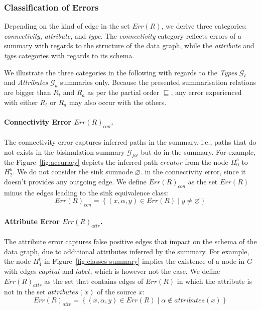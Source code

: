 \subsubsection{Classification of Errors}

Depending on the kind of edge in the set $Err(R)$, we derive three categories: \emph{connectivity}, \emph{attribute}, and \emph{type}. The \emph{connectivity} category reflects errors of a summary with regards to the structure of the data graph, while the \emph{attribute} and \emph{type} categories with regards to its schema.

We illustrate the three categories in the following with regards to the \emph{Types} $\mathcal{G}_t$ and \emph{Attributes} $\mathcal{G}_a$ summaries only. Because the presented summarisation relations are bigger than $R_t$ and $R_a$ as per the partial order $\sqsubseteq$, any error experienced with either $R_t$ or $R_a$ may also occur with the others.

\paragraph{Connectivity Error $Err(R)_{con}$.}

The connectivity error captures inferred paths in the summary, i.e., paths that do not exists in the bisimulation summary $\mathcal{G}_{fbt}$ but do in the summary. For example, the Figure~\ref{fig:accuracy} depicts the inferred path $creator$ from the node $H^b_0$ to $H^b_2$.
We do not consider the sink sumnode $\varnothing$. in the connectivity error, since it doesn't provides any outgoing edge. We define $Err(R)_{con}$ as the set $Err(R)$ minus the edges leading to the sink equivalence class:
$$
Err(R)_{con} = \left\lbrace (x, \alpha, y) \in Err(R) \mid y \neq \varnothing \right\rbrace
$$

\paragraph{Attribute Error $Err(R)_{attr}$.}

The attribute error captures false positive edges that impact on the schema of the data graph, due to additional attributes inferred by the summary. For example, the node $H^t_4$ in Figure~\ref{fig:classes-summary} implies the existence of a node in $G$ with edges $capital$ and $label$, which is however not the case. We define $Err(R)_{attr}$ as the set that contains edges of $Err(R)$ in which the attribute is not in the set $attributes(x)$ of the source $x$:
$$
Err(R)_{attr} = \left\lbrace (x, \alpha, y) \in Err(R) \mid \alpha \not \in attributes(x) \right\rbrace
$$

